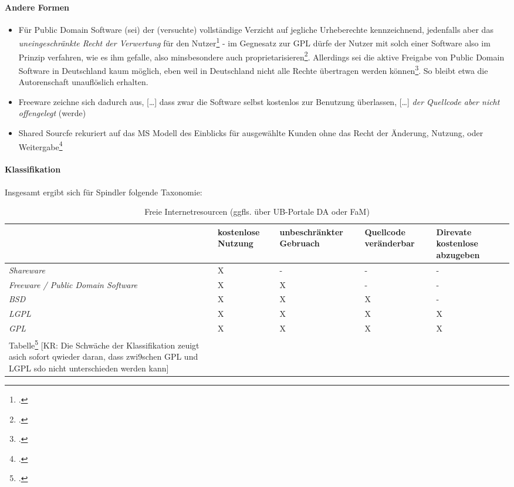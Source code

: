 \documentclass[DIV=calc,BCOR=5mm,11pt,headings=small,oneside,abstract=true, toc=bib]{scrartcl}
\begin{document}
\paragraph{Andere Formen}

\begin{itemize}
  \item \glqq{} Für Public Domain Software (sei) der (versuchte) vollständige
  Verzicht auf jegliche Urheberechte kennzeichnend, jedenfalls aber das
  \emph{uneingeschränkte Recht der Verwertung} für den
  Nutzer\grqq{}\footcite[][17]{Spindler2004a} - im Gegnesatz zur GPL dürfe der
  Nutzer mit solch einer Software also im Prinzip verfahren, wie es ihm gefalle,
  also minsbesondere auch proprietarisieren\footcite[][17]{Spindler2004a}.
  Allerdings sei die aktive Freigabe von Public Domain Software in Deutschland
  kaum möglich, eben weil in Deutschland nicht alle Rechte übertragen werden
  können\footcite[][17]{Spindler2004a}. So bleibt etwa die Autorenschaft
  unauflöslich erhalten.
  \item Freeware zeichne sich dadurch aus, \glqq{}[\ldots] dass zwar die
  Software selbst kostenlos zur Benutzung überlassen, [\ldots] \emph{der
  Quellcode aber nicht offengelegt} (werde)\grqq{}
  \item Shared Sourcfe rekuriert auf das MS Modell des Einblicks für ausgewählte
  Kunden ohne das Recht der Änderung, Nutzung, oder
  Weitergabe\footcite[][18]{Spindler2004a}
\end{itemize}

\paragraph{Klassifikation}
Insgesamt ergibt sich für Spindler folgende Taxonomie:

\begin{table}
\footnotesize
\caption{Freie Internetresourcen (ggfls. über UB-Portale DA oder FaM)}
\begin{center}
\begin{tabular}[h]{|p{4cm}|p{2cm}|p{2cm}|p{2cm}|p{2cm}|}
\hline
& kostenlose Nutzung
& unbeschränkter Gebruach
& Quellcode veränderbar
& Direvate kostenlose abzugeben
\\
\hline \hline 
\emph{Shareware} & X & - & - & -\\
\hline
\emph{Freeware / Public Domain Software} & X & X & - & -\\
\hline
\emph{BSD} & X & X & X & -\\
\hline
\emph{LGPL} & X & X & X & X\\
\hline
\emph{GPL} & X & X & X & X\\
\hline

Tabelle\footcite[vgl.][19]{Spindler2004a}
[KR: Die Schwäche der Klassifikation zeuigt asich sofort qwieder daran, dass
zwi9schen GPL und LGPL sdo nicht unterschieden werden kann]
\end{tabular}
\end{center}
\end{table}
\end{document}
